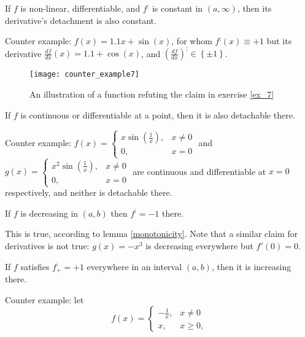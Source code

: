 \documentclass[11pt]{book}
\begin{document}
\begin{exercise}\label{ex_7}If $f$ is non-linear, differentiable, and $f^{;}$ is constant
in $\left(a,\infty\right)$, then its derivative's detachment is also
constant.
\end{exercise}

Counter example: $f\left(x\right)=1.1x+\sin\left(x\right)$, for
whom $f^{;}\left(x\right)\equiv+1$ but its derivative $\frac{df}{dx}\left(x\right)=1.1+\cos\left(x\right)$,
and $\left(\frac{df}{dx}\right)^{;}\in\left\{ \pm1\right\} $.

\begin{figure}[h!]
\texttt{[image: counter\_example7]}
\label{counter_example7}
\caption{An illustration of a function refuting the claim in exercise \ref{ex_7}}
\end{figure}

\begin{exercise}If $f$ is continuous or differentiable at a point, then it is
also detachable there.
\end{exercise}

Counter example: $f\left(x\right)=\begin{cases}
x\sin\left(\frac{1}{x}\right), & x\neq0\\
0, & x=0
\end{cases}$ and $g\left(x\right)=\begin{cases}
x^{2}\sin\left(\frac{1}{x}\right), & x\neq0\\
0, & x=0
\end{cases}$ are continuous and differentiable at $x=0$ respectively, and neither is detachable there.

\begin{exercise}If $f$ is decreasing in $\left(a,b\right)$ then $f^{;}=-1$ there.
\end{exercise}

This is true, according to lemma \ref{monotonicity}.
Note that a similar claim for derivatives is not true: $g\left(x\right)=-x^{3}$
is decreasing everywhere but $f'\left(0\right)=0$.

\begin{exercise}\label{ex_10}If $f$ satisfies $f_{+}^{;}=+1$ everywhere in an interval $\left(a,b\right)$,
then it is increasing there.
\end{exercise}

Counter example: let
\[
f\left(x\right)=\begin{cases}
-\frac{1}{x}, & x\neq0\\
x, & x\geq0,
\end{cases}
\]
\end{document}
